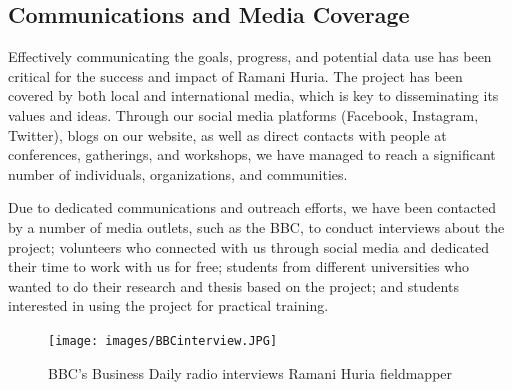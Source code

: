 \documentclass[a4paper,12pt,twoside]{article}
\begin{document}
\newpage
\subsection{Communications and Media Coverage}
\begin{multicols}{2}
Effectively communicating the goals, progress, and potential data use has been critical for the success and impact of Ramani Huria. The project has been covered by both local and international media, which is key to disseminating its values and ideas. Through our social media platforms (Facebook, Instagram, Twitter), blogs on our website, as well as direct contacts with people at conferences, gatherings, and workshops, we have managed to reach a significant number of individuals, organizations, and communities. 

Due to dedicated communications and outreach efforts, we have been contacted by a number of media outlets, such as the BBC, to conduct interviews about the project; volunteers who connected with us through social media and dedicated their time to work with us for free; students from different universities who wanted to do their research and thesis based on the project; and students interested in using the project for practical training.
\end{multicols}
\begin{figure}[h]
	\centering
	\texttt{[image: images/BBCinterview.JPG]}
	\caption{BBC's Business Daily radio interviews Ramani Huria fieldmapper}
\end{figure}
\end{document}
